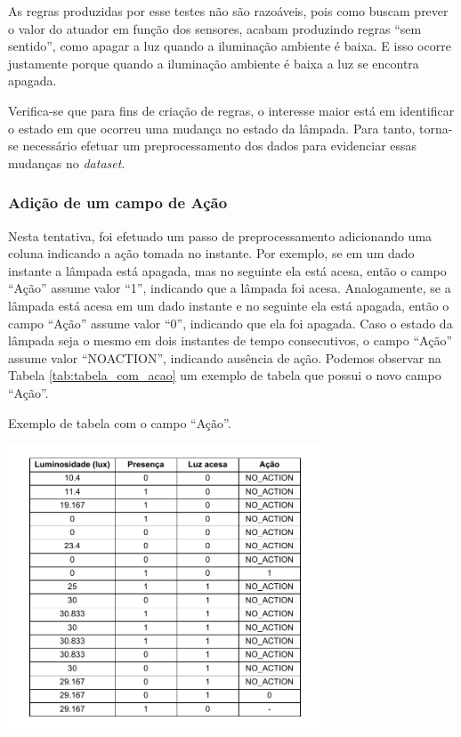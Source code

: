 As regras produzidas por esse testes não são razoáveis, pois como buscam prever o valor do atuador em função dos sensores, acabam produzindo regras ``sem sentido'', como apagar a luz quando a iluminação ambiente é baixa. E isso ocorre justamente porque quando a iluminação ambiente é baixa a luz se encontra apagada.

Verifica-se que para fins de criação de regras, o interesse maior está em identificar o estado em que ocorreu uma mudança no estado da lâmpada. Para tanto, torna-se necessário efetuar um preprocessamento dos dados para evidenciar essas mudanças no \textit{dataset}.

\subsubsection{Adição de um campo de Ação}
\label{subsubsec:action_add}
Nesta tentativa, foi efetuado um passo de preprocessamento adicionando uma coluna indicando a ação tomada no instante. Por exemplo, se em um dado instante a lâmpada está apagada, mas no seguinte ela está acesa, então o campo ``Ação'' assume valor ``1'', indicando que a lâmpada foi acesa. Analogamente, se a lâmpada está acesa em um dado instante e no seguinte ela está apagada, então o campo ``Ação'' assume valor ``0'', indicando que ela foi apagada. Caso o estado da lâmpada seja o mesmo em dois instantes de tempo consecutivos, o campo ``Ação'' assume valor ``NO\underline{\space}ACTION'', indicando ausência de ação. Podemos observar na Tabela \ref{tab:tabela_com_acao} um exemplo de tabela que possui o novo campo ``Ação''.

\begin{table}[h]
	\centering
	\caption{Exemplo de tabela com o campo ``Ação''.}\smallskip
	\label{tab:tabela_com_acao}
	\includegraphics[width=0.7\textwidth]{tabelas/table_with_action.pdf}
\end{table}

